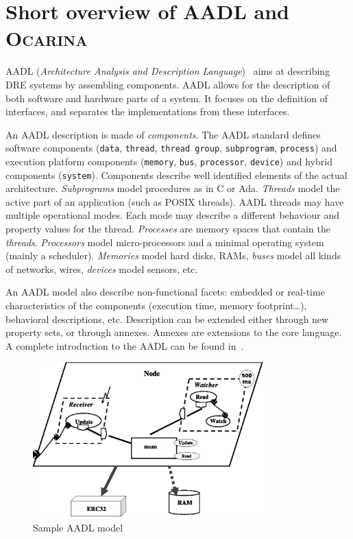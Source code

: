 \documentclass[a4paper,10pt]{article}
\newcommand{\aadl} {\textsc{AADL}}
\newcommand{\ocarina}{\textsc{Ocarina}}
\begin{document}
\section{Short overview of \aadl{} and \ocarina{}}
\label{aadl_descr}

\aadl{} (\textit{Architecture Analysis and Description
  Language})~\cite{aadl-v1.0} aims at describing DRE systems by
assembling components. \aadl{} allows for the description of both
software and hardware parts of a system. It focuses on the definition
of interfaces, and separates the implementations from these
interfaces.

An \aadl{} description is made of \emph{components}.  The \aadl{}
standard defines software components (\texttt{data}, \texttt{thread},
\texttt{thread group}, \texttt{subprogram}, \texttt{process}) and
execution platform components (\texttt{memory}, \texttt{bus},
\texttt{processor}, \texttt{device}) and hybrid components
(\texttt{system}). Components describe well identified elements of the
actual architecture. \emph{Subprograms} model procedures as in C or
Ada. \emph{Threads} model the active part of an application (such as
POSIX threads). \aadl{} threads may have multiple operational
modes. Each mode may describe a different behaviour and property
values for the thread. \emph{Processes} are memory spaces that contain
the \emph{threads}. \emph{Processors} model micro-processors and a
minimal operating system (mainly a scheduler). \emph{Memories} model
hard disks, RAMs, \emph{buses} model all kinds of networks, wires,
\emph{devices} model sensors, etc.

An \aadl{} model also describe non-functional facets: embedded
or real-time characteristics of the components (execution time, memory
footprint\ldots), behavioral descriptions, etc. Description can be
extended either through new property sets, or through annexes. Annexes
are extensions to the core language. A complete introduction to the
\aadl{} can be found in~\cite{feiler06aadl}.

\begin{figure}[h]
\centering
\includegraphics[height=6cm]{figs/figure-aadl-v4.eps}
\caption{Sample \aadl{} model}
\label {case_study}
\end{figure}
\end{document}
